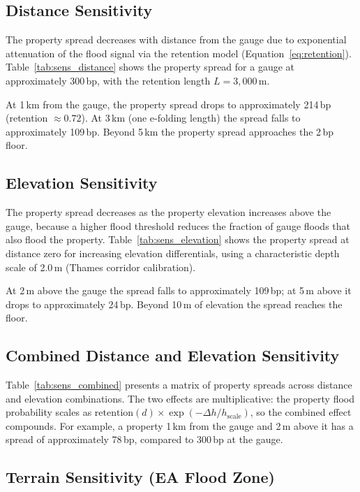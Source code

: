 \documentclass[11pt,a4paper]{article}
\begin{document}
\subsection{Distance Sensitivity}

The property spread decreases with distance from the gauge due to exponential
attenuation of the flood signal via the retention model
(Equation~\eqref{eq:retention}). Table~\ref{tab:sens_distance} shows the property
spread for a gauge at approximately 300\,bp, with the retention length $L = 3{,}000$\,m.

At 1\,km from the gauge, the property spread drops to approximately 214\,bp
(retention $\approx 0.72$). At 3\,km (one e-folding length) the spread falls to
approximately 109\,bp. Beyond 5\,km the property spread approaches the 2\,bp floor.

\subsection{Elevation Sensitivity}

The property spread decreases as the property elevation increases above the gauge,
because a higher flood threshold reduces the fraction of gauge floods that also flood
the property. Table~\ref{tab:sens_elevation} shows the property spread at distance
zero for increasing elevation differentials, using a characteristic depth scale of
2.0\,m (Thames corridor calibration).

At 2\,m above the gauge the spread falls to approximately 109\,bp; at 5\,m above it
drops to approximately 24\,bp. Beyond 10\,m of elevation the spread reaches the floor.

\subsection{Combined Distance and Elevation Sensitivity}

Table~\ref{tab:sens_combined} presents a matrix of property spreads across distance
and elevation combinations. The two effects are multiplicative: the property flood
probability scales as $\text{retention}(d) \times \exp(-\Delta h / h_{\text{scale}})$,
so the combined effect compounds. For example, a property 1\,km from the gauge and
2\,m above it has a spread of approximately 78\,bp, compared to 300\,bp at the gauge.

\subsection{Terrain Sensitivity (EA Flood Zone)}
\end{document}
